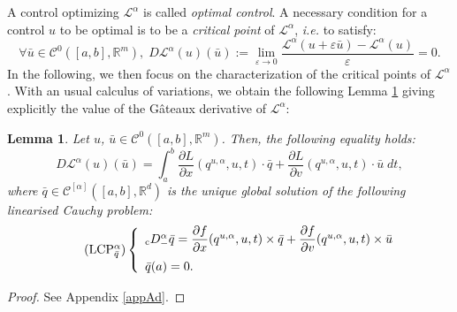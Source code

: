 \documentclass[english,11pt,reqno]{smfart}
\newtheorem{lemma}[theorem]{Lemma}
\def\di{\displaystyle}
\def\eps{\varepsilon}
\newcommand{\R}{\mathbb{R}}
\newcommand{\LL}{\mathcal{L}}
\newcommand{\CC}{\mathscr{C}}
\newcommand{\cDM}{{}_{{\rm c}} D^\alpha_-}
\begin{document}
A control optimizing $\LL^\alpha$ is called \textit{optimal control}. A necessary condition for a control $u$ to be optimal is to be a \textit{critical point} of $\LL^\alpha$, \textit{i.e.} to satisfy:
\begin{equation}
\forall \bar{u} \in  \CC^0 ([a,b],\R^m ), \;  D\LL^\alpha(u)(\bar{u}) := \lim\limits_{\eps \rightarrow 0} \dfrac{\LL^\alpha(u+\eps \bar{u})-\LL^\alpha(u)}{\eps} = 0. 
\end{equation}
In the following, we then focus on the characterization of the critical points of $\LL^\alpha$. With an usual calculus of variations, we obtain the following Lemma \ref{lem1} giving explicitly the value of the G\^ateaux derivative of $\LL^\alpha$:
\begin{lemma}\label{lem1}
Let $u$, $\bar{u} \in \CC^0 ([a,b],\R^m )$. Then, the following equality holds:
\begin{equation}
D\LL^\alpha(u)(\bar{u}) = \di \int_a^b \dfrac{\partial L}{\partial x} (q^{u,\alpha},u,t) \cdot \bar{q} + \dfrac{\partial L}{\partial v} (q^{u,\alpha},u,t) \cdot \bar{u} \; dt,
\end{equation}
where $\bar{q} \in \CC^{[\alpha]} ( [a,b], \R^d )$ is the unique global solution of the following linearised Cauchy problem:
\begin{equation}\label{eqlcpq}\tag{LCP${}^\alpha_{\bar{q}}$}
 \left\lbrace \begin{array}{l}
 		\cDM \bar{q} = \dfrac{\partial f}{\partial x} (q^{u,\alpha},u,t) \times \bar{q} + \dfrac{\partial f}{\partial v} (q^{u,\alpha},u,t) \times \bar{u} \\[10pt]
 		\bar{q}(a) = 0.
        \end{array}
\right. 
\end{equation}
\end{lemma}

\begin{proof}
See Appendix \ref{appAd}.
\end{proof}
\end{document}
